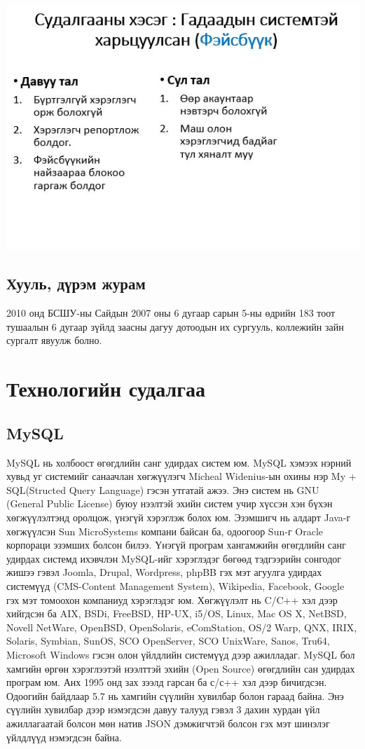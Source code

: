 \documentclass[
oneside, %
english, %
onehalfspacing, %
nolistspacing, %
headsepline, %
]{article} %
\begin{document}
	\includegraphics[width=\textwidth]{gadaadsudalgaa}

	
	\subsection{Хууль, дүрэм журам}
	2010 онд БСШУ-ны Сайдын 2007 оны 6 дугаар сарын 5-ны өдрийн 183 тоот тушаалын 6 дугаар зүйлд заасны дагуу дотоодын их сургууль, коллежийн зайн сургалт явуулж болно. 
	
	
	\section{Технологийн судалгаа}
	
	\subsection{MySQL}
	MySQL нь холбоост өгөгдлийн санг удирдах систем юм. MySQL хэмээх нэрний хувьд уг системийг санаачлан хөгжүүлэгч Micheal Widenius-ын охины нэр My + SQL(Structed Query Language) гэсэн утгатай ажээ.
	Энэ систем нь GNU (General Public License) буюу нээлтэй эхийн систем учир хүссэн хэн бүхэн хөгжүүлэлтэнд оролцож, үнэгүй хэрэглэж болох юм. Эзэмшигч нь алдарт Java-г хөгжүүлсэн Sun MicroSystems компани байсан ба, одоогоор Sun-г Oracle корпораци эзэмших болсон билээ.
	Үнэгүй програм хангамжийн өгөгдлийн санг удирдах системд ихэвчлэн MySQL-ийг хэрэглэдэг бөгөөд тэдгээрийн сонгодог жишээ гэвэл Joomla, Drupal, Wordpress, phpBB гэх мэт агуулга удирдах системүүд (CMS-Content Management System), Wikipedia, Facebook, Google гэх мэт томоохон компаниуд хэрэглэдэг юм.
	Хөгжүүлэлт нь C/C++ хэл дээр хийгдсэн ба AIX, BSDi, FreeBSD, HP-UX, i5/OS, Linux, Mac OS X, NetBSD, Novell NetWare, OpenBSD, OpenSolaris, eComStation, OS/2 Warp, QNX, IRIX, Solaris, Symbian, SunOS, SCO OpenServer, SCO UnixWare, Sanos, Tru64, Microsoft Windows гэсэн олон үйлдлийн системүүд дээр ажилладаг.
	MySQL бол хамгийн өргөн хэрэглээтэй нээлттэй эхийн (Open Source) өгөгдлийн сан удирдах програм юм. Анх 1995 онд зах зээлд гарсан ба с/с++ хэл дээр бичигдсэн. Одоогийн байдлаар 5.7 нь хамгийн сүүлийн хувилбар болон гараад байна. Энэ сүүлийн хувилбар дээр нэмэгдсэн давуу талууд гэвэл 3 дахин хурдан үйл ажиллагаатай болсон мөн натив JSON дэмжигчтэй болсон гэх мэт шинэлэг үйлдлүүд нэмэгдсэн байна.
	
\end{document}
